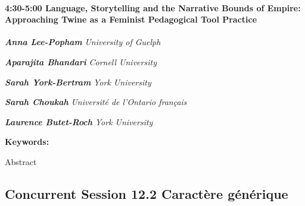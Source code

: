 \documentclass[
]{book}
\begin{document}
\begin{session}
\hypertarget{language-storytelling-and-the-narrative-bounds-of-empire-approaching-twine-as-a-feminist-pedagogical-tool-practice}{%
\paragraph*{\texorpdfstring{4:30-5:00 \textbar{} \textbf{Language,
Storytelling and the Narrative Bounds of Empire: Approaching Twine as a
Feminist Pedagogical Tool} \textbar{}
Practice}{4:30-5:00 \textbar{} Language, Storytelling and the Narrative Bounds of Empire: Approaching Twine as a Feminist Pedagogical Tool \textbar{} Practice}}\label{language-storytelling-and-the-narrative-bounds-of-empire-approaching-twine-as-a-feminist-pedagogical-tool-practice}}

\textbf{\emph{Anna Lee-Popham}} \textbar{} \emph{University of Guelph}

\textbf{\emph{Aparajita Bhandari}} \textbar{} \emph{Cornell University}

\textbf{\emph{Sarah York-Bertram}} \textbar{} \emph{York University}

\textbf{\emph{Sarah Choukah}} \textbar{} \emph{Université de l'Ontario
français}

\textbf{\emph{Laurence Butet-Roch}} \textbar{} \emph{York University}

\textbf{Keywords:}

Abstract
\end{session}

\hypertarget{concurrent-session-12.2-wildcard}{%
\subsection*{Concurrent Session 12.2 \textbar{} Caractère générique}\label{concurrent-session-12.2-wildcard}}
\end{document}
